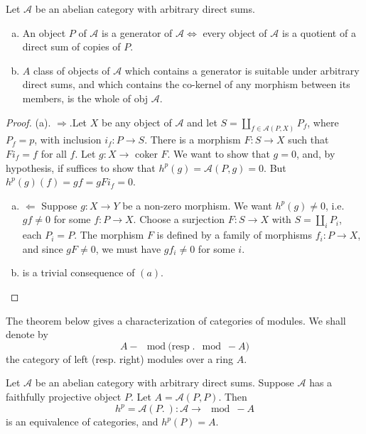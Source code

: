 \setcounter{lemma}{2}
\begin{lemma} %
Let $\mathscr{A}$ be an abelian category with arbitrary direct sums.
\begin{enumerate}[(a)]
\item An object $P$ of $\mathscr{A}$ is a generator of
  $\mathscr{A} \Leftrightarrow$ every object of $\mathscr{A}$ is a
  quotient of a direct sum of copies of $P$. 

\item $A$ class of objects of $\mathscr{A}$ which contains a
  generator is suitable under arbitrary direct sums, and which
  contains the co-kernel of any morphism between its members, is the
  whole of obj $\mathscr{A}$. 
\end{enumerate}
\end{lemma}

\begin{proof}
(a). $\Rightarrow$.\pageoriginale Let $X$ be any object of
  $\mathscr{A}$ and let $S 
  = \coprod_{f \in \mathscr{A} (P, X)}P_f$, where $P_f = p$, with
  inclusion $i_f : P \to S$. There is a morphism $F : S \to X$ such
  that $Fi_f = f $ for all $f$. Let $g: X \to$ coker $F$. We want to
  show that $g = 0$, and, by hypothesis, if suffices to show that
  $h^p (g) = \mathscr{A}(P, g) = 0 $. But $h^p (g) (f) = gf = gFi_f =
  0$.  
\begin{enumerate}[(a)]
\item $\Leftarrow$ Suppose $g : X \to Y$ be a non-zero morphism. We
  want $h^p (g) \neq 0$, i.e. $gf \neq 0$ for some $f: P \to
  X$. Choose a surjection $F : S \to X$ with $S =
  \coprod\limits_{i}P_i$, each $P_i = P$. The morphism $F$ is
  defined by a family of morphisms $f_i : P\to X$, and since $gF \neq
  0$, we must have $gf_i \neq 0$ for some $i$.  

\item is a trivial consequence of $(a)$. 
\end{enumerate}
\end{proof}

The theorem below gives a characterization of categories of
modules. We shall denote by  
$$
A - \mod \text{(resp}. \mod - A) 
$$
the category of left (resp. right) modules over a ring $A$. 

\setcounter{theorem}{3}
\begin{theorem}%
Let $\mathscr{A}$ be an abelian category with arbitrary direct
sums. Suppose $\mathscr{A}$ has a faithfully projective object
$P$. Let $A = \mathscr{A}(P,P)$. Then  
$$
h^p = \mathscr{A}(P. ~ ) : \mathscr{A} \to \mod - A 
$$
is an equivalence of categories, and $h^p(P) = A$.
\end{theorem}

